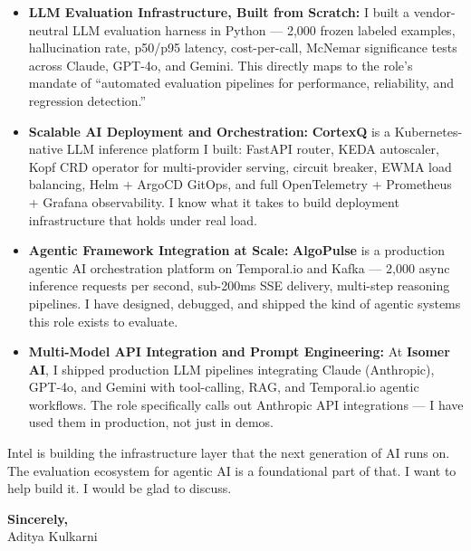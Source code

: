 \documentclass[11pt,letterpaper]{article}
\begin{document}
\begin{itemize}[leftmargin=*, itemsep=3pt, label={\color{IntelBlue}\faAngleRight}]
    \item \textbf{LLM Evaluation Infrastructure, Built from Scratch:} I built a vendor-neutral LLM evaluation harness in Python --- 2,000 frozen labeled examples, hallucination rate, p50/p95 latency, cost-per-call, McNemar significance tests across Claude, GPT-4o, and Gemini. This directly maps to the role's mandate of ``automated evaluation pipelines for performance, reliability, and regression detection.''

    \item \textbf{Scalable AI Deployment and Orchestration:} \textbf{CortexQ} is a Kubernetes-native LLM inference platform I built: FastAPI router, KEDA autoscaler, Kopf CRD operator for multi-provider serving, circuit breaker, EWMA load balancing, Helm + ArgoCD GitOps, and full OpenTelemetry + Prometheus + Grafana observability. I know what it takes to build deployment infrastructure that holds under real load.

    \item \textbf{Agentic Framework Integration at Scale:} \textbf{AlgoPulse} is a production agentic AI orchestration platform on Temporal.io and Kafka --- 2,000 async inference requests per second, sub-200ms SSE delivery, multi-step reasoning pipelines. I have designed, debugged, and shipped the kind of agentic systems this role exists to evaluate.

    \item \textbf{Multi-Model API Integration and Prompt Engineering:} At \textbf{Isomer AI}, I shipped production LLM pipelines integrating Claude (Anthropic), GPT-4o, and Gemini with tool-calling, RAG, and Temporal.io agentic workflows. The role specifically calls out Anthropic API integrations --- I have used them in production, not just in demos.
\end{itemize}

\vspace{6pt}

Intel is building the infrastructure layer that the next generation of AI runs on. The evaluation ecosystem for agentic AI is a foundational part of that. I want to help build it. I would be glad to discuss.

\vspace{12pt}

\textbf{Sincerely,}\\[8pt]
Aditya Kulkarni
\end{document}
